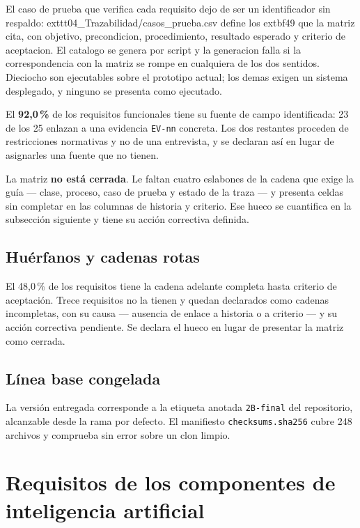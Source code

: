 \documentclass[11pt,a4paper]{article}
\begin{document}
El caso de prueba que verifica cada requisito dejo de ser un identificador sin
respaldo: 	exttt{04\_Trazabilidad/casos\_prueba.csv} define los 	extbf{49}
que la matriz cita, con objetivo, precondicion, procedimiento, resultado
esperado y criterio de aceptacion. El catalogo se genera por script y la
generacion falla si la correspondencia con la matriz se rompe en cualquiera de
los dos sentidos. Dieciocho son ejecutables sobre el prototipo actual; los
demas exigen un sistema desplegado, y ninguno se presenta como ejecutado.

El \textbf{92,0\,\%} de los requisitos funcionales tiene su fuente de campo
identificada: 23 de los 25 enlazan a una evidencia \texttt{EV-nn} concreta. Los dos
restantes proceden de restricciones normativas y no de una entrevista, y se declaran
as\'i en lugar de asignarles una fuente que no tienen.

La matriz \textbf{no est\'a cerrada}. Le faltan cuatro eslabones de la cadena que
exige la gu\'ia --- clase, proceso, caso de prueba y estado de la traza --- y presenta
celdas sin completar en las columnas de historia y criterio. Ese hueco se cuantifica
en la subsecci\'on siguiente y tiene su acci\'on correctiva definida.

\subsection{Hu\'erfanos y cadenas rotas}

El 48,0\,\% de los requisitos tiene la cadena adelante completa hasta criterio de
aceptaci\'on. Trece requisitos no la tienen y quedan declarados como cadenas
incompletas, con su causa --- ausencia de enlace a historia o a criterio --- y su acci\'on
correctiva pendiente. Se declara el hueco en lugar de presentar la matriz como cerrada.

\subsection{L\'inea base congelada}

La versi\'on entregada corresponde a la etiqueta anotada \texttt{2B-final} del
repositorio, alcanzable desde la rama por defecto. El manifiesto
\texttt{checksums.sha256} cubre 248 archivos y comprueba sin error sobre un clon limpio.

\section{Requisitos de los componentes de inteligencia artificial}
\end{document}
